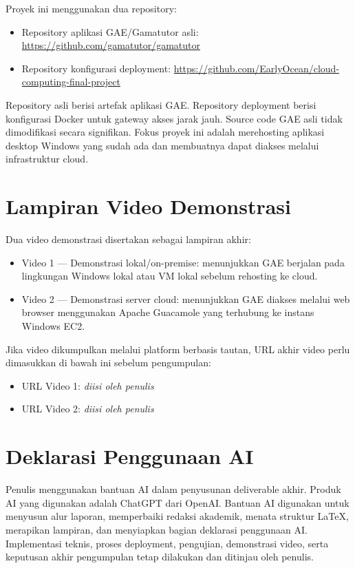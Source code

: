 \documentclass[conference]{IEEEtran}
\begin{document}
Proyek ini menggunakan dua repository:

\begin{itemize}
    \item Repository aplikasi GAE/Gamatutor asli: \url{https://github.com/gamatutor/gamatutor}
    \item Repository konfigurasi deployment: \url{https://github.com/EarlyOcean/cloud-computing-final-project}
\end{itemize}

Repository asli berisi artefak aplikasi GAE. Repository deployment berisi konfigurasi Docker untuk gateway akses jarak jauh. Source code GAE asli tidak dimodifikasi secara signifikan. Fokus proyek ini adalah merehosting aplikasi desktop Windows yang sudah ada dan membuatnya dapat diakses melalui infrastruktur cloud.

\section{Lampiran Video Demonstrasi}

Dua video demonstrasi disertakan sebagai lampiran akhir:

\begin{itemize}
    \item Video 1 --- Demonstrasi lokal/on-premise: menunjukkan GAE berjalan pada lingkungan Windows lokal atau VM lokal sebelum rehosting ke cloud.
    \item Video 2 --- Demonstrasi server cloud: menunjukkan GAE diakses melalui web browser menggunakan Apache Guacamole yang terhubung ke instans Windows EC2.
\end{itemize}

Jika video dikumpulkan melalui platform berbasis tautan, URL akhir video perlu dimasukkan di bawah ini sebelum pengumpulan:

\begin{itemize}
    \item URL Video 1: \textit{diisi oleh penulis}
    \item URL Video 2: \textit{diisi oleh penulis}
\end{itemize}

\section{Deklarasi Penggunaan AI}

Penulis menggunakan bantuan AI dalam penyusunan deliverable akhir. Produk AI yang digunakan adalah ChatGPT dari OpenAI. Bantuan AI digunakan untuk menyusun alur laporan, memperbaiki redaksi akademik, menata struktur LaTeX, merapikan lampiran, dan menyiapkan bagian deklarasi penggunaan AI. Implementasi teknis, proses deployment, pengujian, demonstrasi video, serta keputusan akhir pengumpulan tetap dilakukan dan ditinjau oleh penulis.
\end{document}
